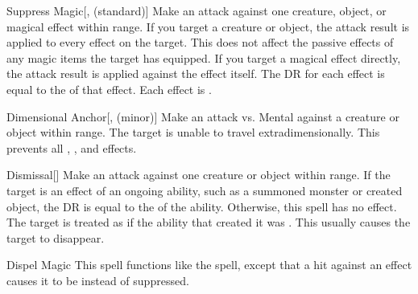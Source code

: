 \lowercase{\hypertarget{spell:Suppress Magic}{}}\label{spell:Suppress Magic}
\begin{ability}[\nth{1}]{\hypertarget{spell:Suppress Magic}{Suppress Magic}}[,  (standard)]
Make an attack against one creature, object, or magical effect within \rngmed range.
If you target a creature or object, the attack result is applied to every  effect on the target.
This does not affect the passive effects of any magic items the target has equipped.
If you target a magical effect directly, the attack result is applied against the effect itself.
The DR for each effect is equal to the  of that effect.
\hit Each effect is .
\end{ability}
\vspace{0.25em}



\lowercase{\hypertarget{spell:Dimensional Anchor}{}}\label{spell:Dimensional Anchor}
\begin{ability}[\nth{2}]{\hypertarget{spell:Dimensional Anchor}{Dimensional Anchor}}[,  (minor)]
Make an attack vs. Mental against a creature or object within \rngmed range.
\hit The target is unable to travel extradimensionally.
This prevents all , , and  effects.
\end{ability}
\vspace{0.25em}



\lowercase{\hypertarget{spell:Dismissal}{}}\label{spell:Dismissal}
\begin{ability}[\nth{2}]{\hypertarget{spell:Dismissal}{Dismissal}}[]
Make an attack against one creature or object within \rngmed range.
If the target is an effect of an ongoing  ability, such as a summoned monster or created object, the DR is equal to the  of the ability.
Otherwise, this spell has no effect.
\hit The target is treated as if the ability that created it was .
This usually causes the target to disappear.
\end{ability}
\vspace{0.25em}



\lowercase{\hypertarget{spell:Dispel Magic}{}}\label{spell:Dispel Magic}
\begin{ability}[\nth{2}]{\hypertarget{spell:Dispel Magic}{Dispel Magic}}
This spell functions like the  spell, except that a hit against an effect causes it to be  instead of suppressed.
\end{ability}
\vspace{0.25em}



